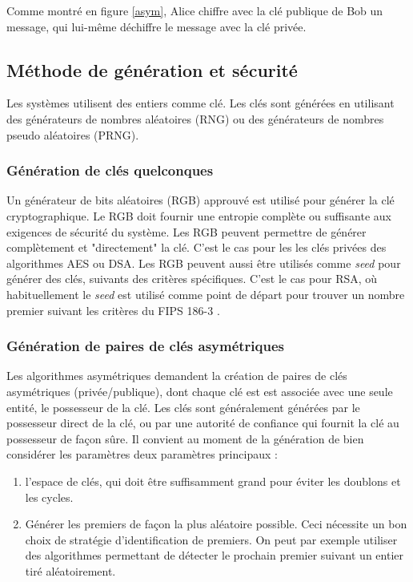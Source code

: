 Comme montré en figure \ref{asym}, Alice chiffre avec la clé publique de Bob un message, qui lui-même déchiffre le message avec la clé privée.

\subsection{Méthode de génération et sécurité}


Les systèmes utilisent des entiers comme clé. Les clés sont générées en utilisant des générateurs de nombres aléatoires (RNG) ou des générateurs de nombres pseudo aléatoires (PRNG). 

\subsubsection{Génération de clés quelconques}
Un générateur de bits aléatoires (RGB) approuvé est utilisé pour générer la clé cryptographique. Le RGB doit fournir une entropie complète ou suffisante aux exigences de sécurité du système. Les RGB peuvent  permettre de générer complètement et "directement" la clé. C'est le cas pour les  les clés privées des algorithmes AES ou DSA.
Les RGB peuvent aussi être utilisés comme \textit{seed} pour générer des clés, suivants des critères spécifiques. C'est le cas pour RSA, où habituellement le \textit{seed} est utilisé comme point de départ pour trouver un nombre premier suivant les critères du FIPS 186-3 \cite{fips186-3}.

\subsubsection{Génération de paires de clés asymétriques}
Les algorithmes asymétriques demandent la création de paires de clés asymétriques (privée/publique), dont chaque clé est est associée avec une seule entité, le possesseur de la clé. Les clés sont généralement générées par le possesseur direct de la clé, ou par une autorité de confiance qui fournit la clé au possesseur de façon sûre.
Il convient au moment de la génération de bien considérer les paramètres deux paramètres principaux : 
\begin{enumerate}
\item l'espace de clés, qui doit être suffisamment grand pour éviter les doublons et les cycles.
\item Générer les premiers de façon la plus aléatoire possible. Ceci nécessite un bon choix de stratégie d'identification de premiers. On peut par exemple utiliser des algorithmes permettant de détecter le prochain premier suivant un entier tiré aléatoirement. 
\end{enumerate}


